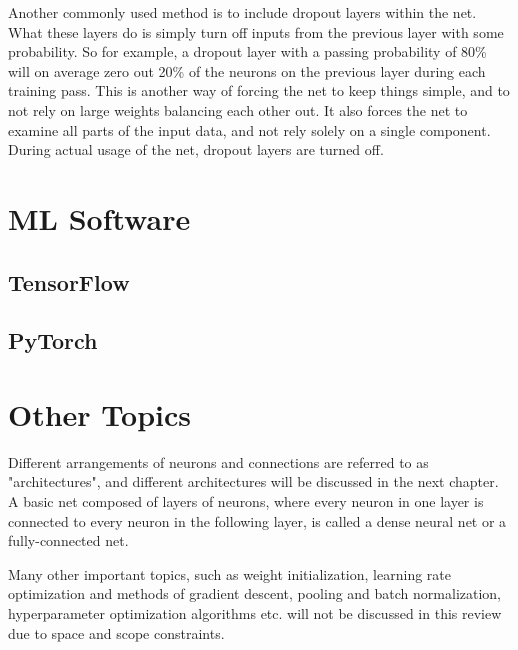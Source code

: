 Another commonly used method is to include dropout layers within the net. What these layers do is simply turn off inputs from the previous layer with some probability. So for example, a dropout layer with a passing probability of 80\% will on average zero out 20\% of the neurons on the previous layer during each training pass. This is another way of forcing the net to keep things simple, and to not rely on large weights balancing each other out. It also forces the net to examine all parts of the input data, and not rely solely on a single component. During actual usage of the net, dropout layers are turned off.

\section{ML Software}

\subsection*{TensorFlow}

\subsection*{PyTorch}

\section{Other Topics}

Different arrangements of neurons and connections are referred to as "architectures", and different architectures will be discussed in the next chapter. A basic net composed of layers of neurons, where every neuron in one layer is connected to every neuron in the following layer, is called a dense neural net or a fully-connected net.

Many other important topics, such as weight initialization, learning rate optimization and methods of gradient descent, pooling and batch normalization, hyperparameter optimization algorithms etc. will not be discussed in this review due to space and scope constraints.